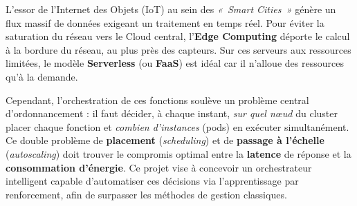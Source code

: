 L'essor de l'Internet des Objets (IoT) au sein des \textit{«~Smart Cities~»} génère un flux massif de données exigeant un traitement en temps réel. Pour éviter la saturation du réseau vers le Cloud central, l'\textbf{Edge Computing} déporte le calcul à la bordure du réseau, au plus près des capteurs. Sur ces serveurs aux ressources limitées, le modèle \textbf{Serverless} (ou \textbf{FaaS}) est idéal car il n'alloue des ressources qu'à la demande.

Cependant, l'orchestration de ces fonctions soulève un problème central d'ordonnancement : il faut décider, à chaque instant, \textit{sur quel nœud} du cluster placer chaque fonction et \textit{combien d'instances} (pods) en exécuter simultanément. Ce double problème de \textbf{placement} (\textit{scheduling}) et de \textbf{passage à l'échelle} (\textit{autoscaling}) doit trouver le compromis optimal entre la \textbf{latence} de réponse et la \textbf{consommation d'énergie}. Ce projet vise à concevoir un orchestrateur intelligent capable d'automatiser ces décisions via l'apprentissage par renforcement, afin de surpasser les méthodes de gestion classiques.
